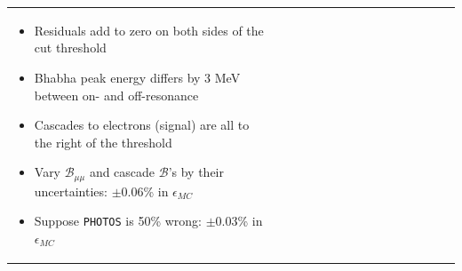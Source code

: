 \documentclass[landscape]{article}
\begin{document}
\begin{tabular}{p{0.6\linewidth} p{0.4\linewidth}}
\begin{minipage}{1.1\linewidth}
    \begin{itemize}

      \item Residuals add to zero on both sides of the cut threshold

\vspace{1 cm}
      \item Bhabha peak energy differs by 3 MeV between on- and off-resonance

\vspace{1 cm}
      \item Cascades to electrons (signal) are all to the right of the threshold

\vspace{1 cm}
      \item Vary $\mathcal{B}_{\mu\mu}$ and cascade $\mathcal{B}$'s by
      their uncertainties: $\pm$0.06\% in $\epsilon_{MC}$

\vspace{1 cm}
      \item Suppose {\tt PHOTOS} is 50\% wrong: $\pm$0.03\% in $\epsilon_{MC}$

    \end{itemize}

  \end{minipage} \\
\end{tabular}
\end{document}
